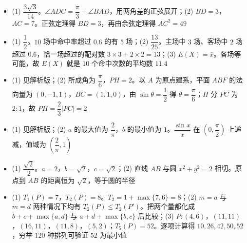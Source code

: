 \begin{itemize}[leftmargin=2.6em]
  \item[\textbf{15.}] (1) $\dfrac{3\sqrt3}{14}$。$\angle ADC=\dfrac\pi3+\angle BAD$，用两角差的正弦展开；(2) $BD=3$，$AC=7$。正弦定理得 $BD=3$，再由余弦定理得 $AC^2=49$
  \item[\textbf{16.}] (1) $\dfrac12$。$10$ 场中命中率超过 $0.6$ 的有 $5$ 场；(2) $\dfrac{13}{25}$。主场中 $3$ 场、客场中 $2$ 场超过 $0.6$，恰一场超过的配对数 $3\times3+2\times2=13$；(3) $E(X)=\bar x$。各场等可能，故 $E(X)$ 就是 $10$ 个命中次数的平均数 $11.4$
  \item[\textbf{17.}] (1) 见解析版；(2) 所成角为 $\dfrac\pi6$，$PH=2$。以 $A$ 为原点建系，平面 $ABF$ 的法向量为 $(0,-1,1)$，$BC=(1,1,0)$，由 $\sin\theta=\dfrac12$ 得 $\theta=\dfrac\pi6$；$H$ 分 $PC$ 为 $2:1$，故 $PH=\dfrac23|PC|=2$
  \item[\textbf{18.}] (1) 见解析版；(2) $a$ 的最大值为 $\dfrac2\pi$，$b$ 的最小值为 $1$。$\dfrac{\sin x}x$ 在 $\left(0,\dfrac\pi2\right)$ 上递减，值域为 $\left(\dfrac2\pi,1\right)$
  \item[\textbf{19.}] (1) $\dfrac{\sqrt2}2$。$a=2$，$b=\sqrt2$，$c=\sqrt2$；(2) 直线 $AB$ 与圆 $x^2+y^2=2$ 相切。原点到 $AB$ 的距离恒为 $\sqrt2$，等于圆的半径
  \item[\textbf{20.}] (1) $T_1(P)=7$，$T_2(P)=8$。$T_2=1+\max\{7,6\}=8$；(2) $m=a$ 与 $m=d$ 两种情况下均有 $T_2(P)\leqslant T_2(P')$。把两个量都化成 $b+c+\max\{a,d\}$ 与 $a+d+\max\{b,c\}$ 后比较；(3) $P:(4,6)$，$(11,11)$，$(16,11)$，$(11,8)$，$(5,2)$；$T_5(P)=52$。逐项计算得 $10,26,42,50,52$，穷举 $120$ 种排列可验证 $52$ 为最小值
\end{itemize}
